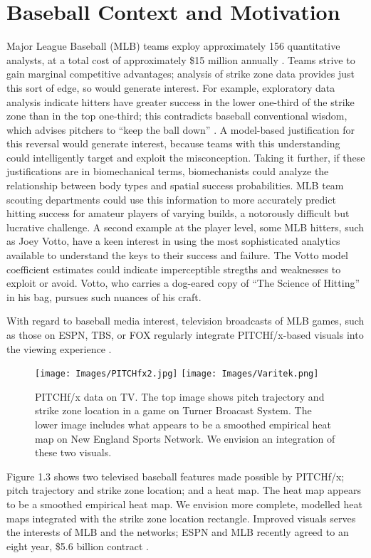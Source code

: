 \section{Baseball Context and Motivation}

Major League Baseball (MLB\textsuperscript{\textregistered}) teams exploy approximately 156 quantitative analysts, at a total cost of approximately \$15 million annually \citep{Lindbergh2016}. Teams strive to gain marginal competitive advantages; analysis of strike zone data provides just this sort of edge, so would generate interest. For example, exploratory data analysis indicate hitters have greater success in the lower one-third of the strike zone than in the top one-third; this contradicts baseball conventional wisdom, which advises pitchers to ``keep the ball down'' \citep{Stallings2003}. A model-based justification for this reversal would generate interest, because teams with this understanding could intelligently target and exploit the misconception. Taking it further, if these justifications are in biomechanical terms, biomechanists could analyze the relationship between body types and spatial success probabilities. MLB\textsuperscript{\textregistered} team scouting departments could use this information to more accurately predict hitting success for amateur players of varying builds, a notorously difficult but lucrative challenge. A second example at the player level, some MLB\textsuperscript{\textregistered} hitters, such as Joey Votto, have a keen interest in using the most sophisticated analytics available to understand the keys to their success and failure\citep{Daugherty2015}. The Votto model coefficient estimates could indicate imperceptible stregths and weaknesses to exploit or avoid. Votto, who carries a dog-eared copy of ``The Science of Hitting'' in his bag, pursues such nuances of his craft. 

With regard to baseball media interest, television broadcasts of MLB\textsuperscript{\textregistered} games, such as those on ESPN, TBS, or FOX regularly integrate PITCHf/x\textsuperscript{\textregistered}-based visuals into the viewing experience \citep{Cross2015}. 
        \begin{figure}[H]
      	\centering
      	\texttt{[image: Images/PITCHfx2.jpg]} 
      	\texttt{[image: Images/Varitek.png]} 
      	\caption{PITCHf/x\textsuperscript{\textregistered} data on TV. The top image shows pitch trajectory and strike zone location in a game on Turner Broacast System. The lower image includes what appears to be a smoothed empirical heat map on New England Sports Network. We envision an integration of these two visuals.}
      	\end{figure} 
Figure 1.3 shows two televised baseball features made possible by PITCHf/x\textsuperscript{\textregistered}; pitch trajectory and strike zone location; and a heat map. The heat map appears to be a smoothed empirical heat map. We envision more complete, modelled heat maps integrated with the strike zone location rectangle. Improved visuals serves the interests of MLB\textsuperscript{\textregistered} and the networks; ESPN\textsuperscript{\textregistered} and MLB\textsuperscript{\textregistered} recently agreed to an eight year, \$5.6 billion contract \citep{Newman2012}.

